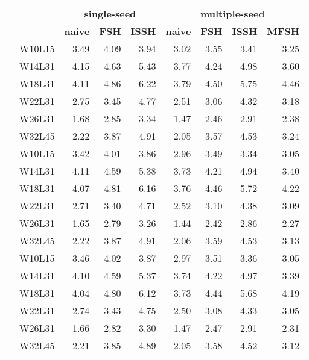 \section*{\phantom{A}}
\begin{table}[!ht]
	\raggedleft
	\begin{tabular}{c r | rrr | rrrr}
		& & \multicolumn{3}{|c}{\textbf{single-seed}} & \multicolumn{4}{|c}{\textbf{multiple-seed}} \\
		& & \textbf{naive} & \textbf{FSH} & \textbf{ISSH} & \textbf{naive} & \textbf{FSH} & \textbf{ISSH} & \textbf{MFSH} \\
		\toprule
		\multirow{6}{*}{\rotatebox[origin=c]{90}{\textbf{R1000}}}
		& W10L15 & 3.49 & 4.09 & 3.94 & 3.02 & 3.55 & 3.41 & 3.25 \\
		& W14L31 & 4.15 & 4.63 & 5.43 & 3.77 & 4.24 & 4.98 & 3.60 \\
		& W18L31 & 4.11 & 4.86 & 6.22 & 3.79 & 4.50 & 5.75 & 4.46 \\
		& W22L31 & 2.75 & 3.45 & 4.77 & 2.51 & 3.06 & 4.32 & 3.18 \\
		& W26L31 & 1.68 & 2.85 & 3.34 & 1.47 & 2.46 & 2.91 & 2.38 \\
		& W32L45 & 2.22 & 3.87 & 4.91 & 2.05 & 3.57 & 4.53 & 3.24 \\
		\midrule
		\multirow{6}{*}{\rotatebox[origin=c]{90}{\textbf{R1500}}}
		& W10L15 & 3.42 & 4.01 & 3.86 & 2.96 & 3.49 & 3.34 & 3.05 \\
		& W14L31 & 4.11 & 4.59 & 5.38 & 3.73 & 4.21 & 4.94 & 3.40 \\
		& W18L31 & 4.07 & 4.81 & 6.16 & 3.76 & 4.46 & 5.72 & 4.22 \\
		& W22L31 & 2.71 & 3.40 & 4.71 & 2.52 & 3.10 & 4.38 & 3.09 \\
		& W26L31 & 1.65 & 2.79 & 3.26 & 1.44 & 2.42 & 2.86 & 2.27 \\
		& W32L45 & 2.22 & 3.87 & 4.91 & 2.06 & 3.59 & 4.53 & 3.13 \\
		\midrule
		\multirow{6}{*}{\rotatebox[origin=c]{90}{\textbf{R2000}}}
		& W10L15 & 3.46 & 4.02 & 3.87 & 2.97 & 3.51 & 3.36 & 3.05 \\
		& W14L31 & 4.10 & 4.59 & 5.37 & 3.74 & 4.22 & 4.97 & 3.39 \\
		& W18L31 & 4.04 & 4.80 & 6.12 & 3.73 & 4.44 & 5.68 & 4.19 \\
		& W22L31 & 2.74 & 3.43 & 4.75 & 2.50 & 3.08 & 4.33 & 3.05 \\
		& W26L31 & 1.66 & 2.82 & 3.30 & 1.47 & 2.47 & 2.91 & 2.31 \\
		& W32L45 & 2.21 & 3.85 & 4.89 & 2.05 & 3.58 & 4.52 & 3.12 \\

\end{tabular}
\end{table}
